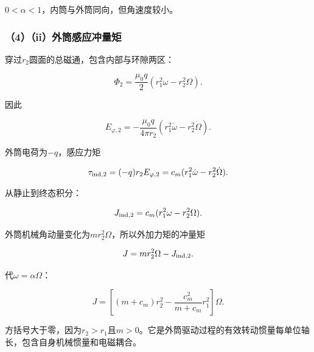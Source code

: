\documentclass[12pt,a4paper,fontset=fandol]{ctexart}
\begin{document}
\(0<\alpha<1\)，内筒与外筒同向，但角速度较小。

\begin{center}
\begin{minipage}{\linewidth}
\centering\begingroup{}
\ifdim\wd\diagrambox>.88\linewidth
\sbox{\diagrambox}{\resizebox{.88\linewidth}{!}{\usebox{\diagrambox}}}\fi
\ifdim\ht\diagrambox>.38\textheight
\resizebox{!}{.38\textheight}{\usebox{\diagrambox}}
\else\usebox{\diagrambox}\fi
\par{}\endgroup\end{minipage}\end{center}

\subsubsection{（4）（ii）外筒感应冲量矩}\label{iiux5916ux7b52ux611fux5e94ux51b2ux91cfux77e9}

穿过\(r_2\)圆面的总磁通，包含内部与环隙两区：

\[
\Phi_2=\frac{\mu_0q}{2}
(r_1^2\omega-r_2^2\Omega).
\]

因此

\[
E_{\varphi,2}=-\frac{\mu_0q}{4\pi r_2}
(r_1^2\dot\omega-r_2^2\dot\Omega).
\]

外筒电荷为\(-q\)，感应力矩

\[
\tau_{\rm ind,2}=(-q)r_2E_{\varphi,2}
=c_m(r_1^2\dot\omega-r_2^2\dot\Omega).
\]

从静止到终态积分：

\[
J_{\rm ind,2}=c_m(r_1^2\omega-r_2^2\Omega).
\]

外筒机械角动量变化为\(m r_2^2\Omega\)，所以外加力矩的冲量矩

\[
J=m r_2^2\Omega-J_{\rm ind,2}.
\]

代\(\omega=\alpha\Omega\)：

\[
\boxed{
J=\left[(m+c_m)r_2^2
-\frac{c_m^2}{m+c_m}r_1^2\right]\Omega}.
\]

方括号大于零，因为\(r_2>r_1\)且\(m>0\)。它是外筒驱动过程的有效转动惯量每单位轴长，包含自身机械惯量和电磁耦合。
\end{document}
